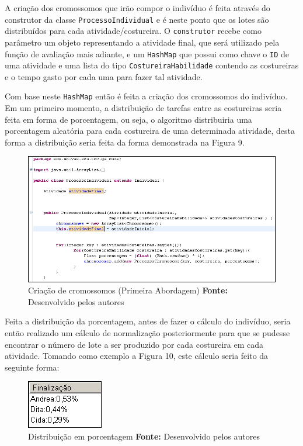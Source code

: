 \par A criação dos cromossomos que irão compor o indivíduo é feita através do construtor da classe \texttt{ProcessoIndividual} e 
 é neste ponto que os lotes são distribuídos para cada atividade/costureira. O \texttt{construtor} recebe como parâmetro um objeto representando a atividade final, que será utilizado pela função de avaliação mais adiante, e um \texttt{HashMap} que possui como chave
o \texttt{ID} de uma atividade e uma lista do  tipo \texttt{CostureiraHabilidade} contendo as costureiras e o tempo 
gasto por cada uma para fazer tal atividade.

\par Com base neste \texttt{HashMap} então é feita a criação dos cromossomos do indivíduo.
Em um primeiro momento, a distribuição de tarefas entre as costureiras seria feita em forma 
de porcentagem, ou seja, o algoritmo distribuiria uma porcentagem aleatória para cada costureira de 
uma determinada atividade, desta forma a distribuição seria feita da forma demonstrada na Figura 9.


\begin{figure}[h!]
	\centerline{\includegraphics[scale=0.8]{./imagens/tentativa_1_individual.png}}
	\caption[Classe CostureiraHabilidade]
	{Criação de cromossomos (Primeira Abordagem) \textbf{Fonte:} Desenvolvido pelos autores}
	\label{fig:exemplo1}
\end{figure}
 
\par Feita a distribuição da porcentagem, antes de fazer o cálculo do indivíduo, seria então realizado 
um cálculo de normalização posteriormente para que se pudesse encontrar o número de lote a ser produzido 
por cada costureira em cada atividade. Tomando como exemplo a Figura 10, este cálculo seria feito da seguinte forma:

\begin{figure}[h!]
	\centerline{\includegraphics[scale=1.0]{./imagens/distribuicao_porcentagem.png}}
	\caption[Classe CostureiraHabilidade]
	{Distribuição em porcentagem \textbf{Fonte:} Desenvolvido pelos autores}
	\label{fig:exemplo1}
\end{figure}

